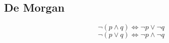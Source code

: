\subsection{De Morgan}

$$\neg(p \land q) \iff \neg p \lor \neg q$$
$$\neg(p \lor q) \iff \neg p \land \neg q$$